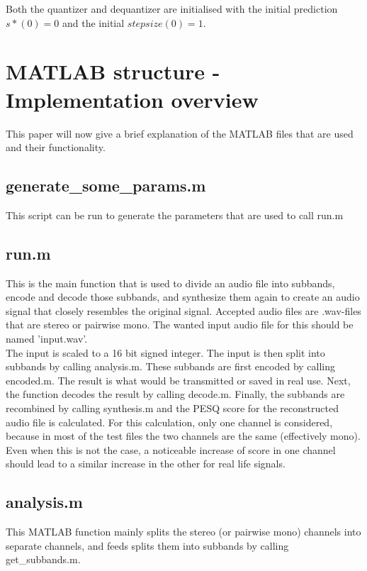 \documentclass[a4paper]{article}
\begin{document}
Both the quantizer and dequantizer are initialised with the initial prediction $s*(0) = 0$ and the initial $stepsize(0) = 1$.

\section{MATLAB structure - Implementation overview}
This paper will now give a brief explanation of the MATLAB files that are used and their functionality.

\subsection{generate\_some\_params.m}
This script can be run to generate the parameters that are used to call run.m

\subsection{run.m}
This is the main function that is used to divide an audio file into subbands, encode and decode those subbands, and synthesize them again to create an audio signal that closely resembles the original signal. Accepted audio files are .wav-files that are stereo or pairwise mono. The wanted input audio file for this should be named 'input.wav'.
\\
The input is scaled to a 16 bit signed integer. The input is then split into subbands by calling analysis.m. These subbands are first encoded by calling encoded.m. The result is what would be transmitted or saved in real use. Next, the function decodes the result by calling decode.m. Finally, the subbands are recombined by calling synthesis.m and the PESQ score for the reconstructed audio file is calculated. For this calculation, only one channel is considered, because in most of the test files the two channels are the same (effectively mono). Even when this is not the case, a noticeable increase of score in one channel should lead to a similar increase in the other for real life signals.

\subsection{analysis.m}
This MATLAB function mainly splits the stereo (or pairwise mono) channels into separate channels, and feeds splits them into subbands by calling get\_subbands.m.
\end{document}
